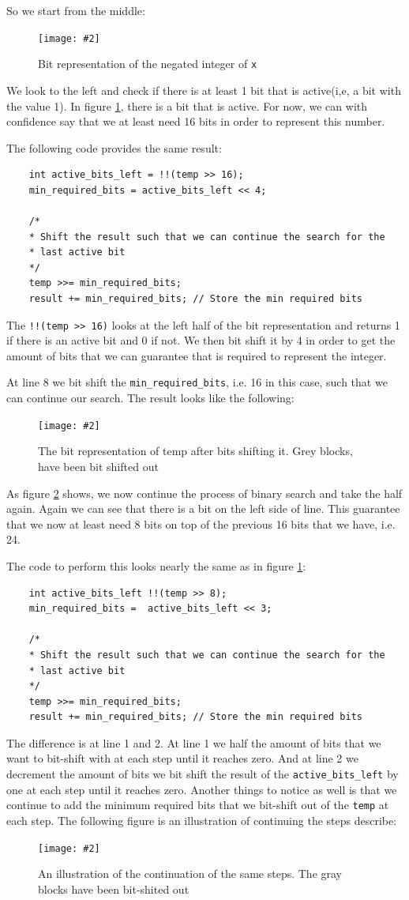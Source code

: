 \documentclass[11pt]{article}
\newcommand{\code}[1]{{\colorbox{lightgray!15}{\color{black}\texttt{#1}}}}
\newcommand{\centeredpic}[4][0.5]{
    \begin{figure}[h]
        \texttt{[image: \#2]}
        \centering
        \caption{#3}
        \label{fig:#4}
    \end{figure}
}
\begin{document}
So we start from the middle:

\centeredpic{howmanybits-01.png}{Bit representation of the negated integer of \code{x}}{hmb-step-1}

We look to the left and check if there is at least 1 bit that is active(i,e, a bit with the value 1). In figure \ref{fig:hmb-step-1}, there is a bit that is active.
For now, we can with confidence say that we at least need 16 bits in order to represent this number.

The following code provides the same result:
\begin{lstlisting}
    int active_bits_left = !!(temp >> 16);
    min_required_bits = active_bits_left << 4;
    
    /* 
    * Shift the result such that we can continue the search for the 
    * last active bit 
    */
    temp >>= min_required_bits;
    result += min_required_bits; // Store the min required bits
\end{lstlisting}

The \code{!!(temp >> 16)} looks at the left half of the bit representation and returns 1 if there is an active bit and 0 if not. We then bit shift it by 4 in order to get the amount of bits 
that we can guarantee that is required to represent the integer. 

At line 8 we bit shift the \code{min\_required\_bits}, i.e. 16 in this case, such that we can continue our search. The result looks like the following:
\centeredpic{howmanybits-02.png}{The bit representation of temp after bits shifting it. Grey blocks, have been bit shifted out}{hmb-step-2}

As figure \ref{fig:hmb-step-2} shows, we now continue the process of binary search and take the half again. Again we can see that there is
a bit on the left side of line. This guarantee that we now at least need 8 bits on top of the previous 16 bits that we have, i.e. 24.

The code to perform this looks nearly the same as in figure \ref{fig:hmb-step-1}:
\begin{lstlisting}
    int active_bits_left !!(temp >> 8);
    min_required_bits =  active_bits_left << 3;

    /* 
    * Shift the result such that we can continue the search for the 
    * last active bit 
    */
    temp >>= min_required_bits;
    result += min_required_bits; // Store the min required bits
\end{lstlisting}

The difference is at line 1 and 2. At line 1 we half the amount of bits that we want to bit-shift with at each step until it reaches zero. And at line 2 we decrement the 
amount of bits we bit shift the result of the \code{active\_bits\_left} by one at each step until it reaches zero. 
Another things to notice as well is that we continue to add the minimum required bits that we bit-shift out of the \code{temp} at each step.
The following figure is an illustration of continuing the steps describe: 
\centeredpic{howmanybits-03.png}{An illustration of the continuation of the same steps. The gray blocks have been bit-shited out}{hmb-step-last}
\end{document}
